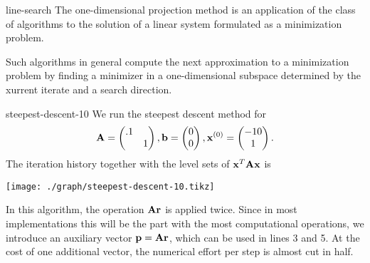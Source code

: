 \begin{Remark}{line-search}
  The one-dimensional projection method is an application of the class
  of  algorithms to the solution of a linear
  system formulated as a minimization problem.

  Such algorithms in general compute the next approximation to a
  minimization problem by finding a minimizer in a one-dimensional
  subspace determined by the xurrent iterate and a search direction.
\end{Remark}

\begin{Example}{steepest-descent-10}
  We run the steepest descent method for
  \begin{gather}
    \mathbf A =
    \begin{pmatrix}
      .1 \\&1
    \end{pmatrix},
    \mathbf b =
    \begin{pmatrix}
      0\\0
    \end{pmatrix},
    \mathbf x^{(0)} =
    \begin{pmatrix}
      -10\\1
    \end{pmatrix}.
  \end{gather}
  The iteration history together with  the level sets of $\mathbf x^T\mathbf A\mathbf x$ is
  \begin{center}
    \texttt{[image: ./graph/steepest-descent-10.tikz]}
  \end{center}
\end{Example}

\begin{remark}
  In this algorithm, the operation $\mathbf A\mathbf r$ is applied twice. Since
  in most implementations this will be the part with the most
  computational operations, we introduce an auxiliary vector
  $\mathbf p = \mathbf A\mathbf r$, which can be used in lines 3 and 5. At the cost of
  one additional vector, the numerical effort per step is almost
  cut in half.
\end{remark}


